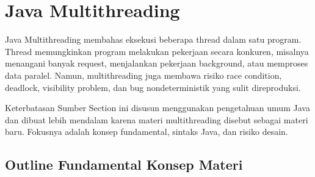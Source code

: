 \section{Java Multithreading}

Java Multithreading membahas eksekusi beberapa thread dalam satu program. Thread memungkinkan program melakukan pekerjaan secara konkuren, misalnya menangani banyak request, menjalankan pekerjaan background, atau memproses data paralel. Namun, multithreading juga membawa risiko race condition, deadlock, visibility problem, dan bug nondeterministik yang sulit direproduksi.

\begin{cmt}{Keterbatasan Sumber}{}
Section ini disusun menggunakan pengetahuan umum Java dan dibuat lebih mendalam karena materi multithreading disebut sebagai materi baru. Fokusnya adalah konsep fundamental, sintaks Java, dan risiko desain.
\end{cmt}

\subsection{Outline Fundamental Konsep Materi}

